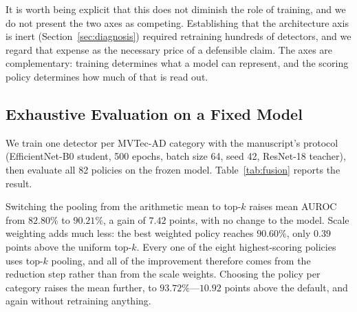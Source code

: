 It is worth being explicit that this does not diminish the role of training, and
we do not present the two axes as competing. Establishing that the architecture
axis is inert (Section~\ref{sec:diagnosis}) required retraining hundreds of
detectors, and we regard that expense as the necessary price of a defensible
claim. The axes are complementary: training determines what a model can
represent, and the scoring policy determines how much of that is read out.

\subsection{Exhaustive Evaluation on a Fixed Model}
\label{subsec:policy_results}

We train one detector per MVTec-AD category with the manuscript's protocol
(EfficientNet-B0 student, 500 epochs, batch size 64, seed 42, ResNet-18 teacher),
then evaluate all 82 policies on the frozen model. Table~\ref{tab:fusion} reports
the result.

\begin{table}[t]
\centering
\caption{Scoring policies evaluated on one frozen detector per category
(15 categories, 82 policies). ``Worst category'' is the lowest per-category
AUROC, i.e.\ the failure mode that matters in deployment. The default is the
policy the published pipeline uses.}
\label{tab:fusion}

\end{table}

Switching the pooling from the arithmetic mean to top-$k$ raises mean AUROC from
$82.80\%$ to $90.21\%$, a gain of $7.42$ points, with no change to the model.
Scale weighting adds much less: the best weighted policy reaches $90.60\%$, only
$0.39$ points above the uniform top-$k$. Every one of the eight highest-scoring
policies uses top-$k$ pooling, and all of the improvement therefore comes from
the reduction step rather than from the scale weights. Choosing the policy
per category raises the mean further, to $93.72\%$---$10.92$ points above the
default, and again without retraining anything.

